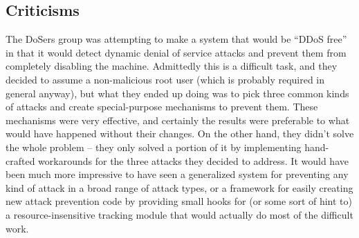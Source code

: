 \subsection{Criticisms}
\label{sec:groups:critic}

The DoSers group was attempting to make a system that would be ``DDoS free'' in
that it would detect dynamic denial of service attacks and prevent them from
completely disabling the machine. Admittedly this is a difficult task, and they
decided to assume a non-malicious root user (which is probably required in
general anyway), but what they ended up doing was to pick three common kinds of
attacks and create special-purpose mechanisms to prevent them. These mechanisms
were very effective, and certainly the results were preferable to what would
have happened without their changes. On the other hand, they didn't solve the
whole problem -- they only solved a portion of it by implementing hand-crafted
workarounds for the three attacks they decided to address. It would have been
much more impressive to have seen a generalized system for preventing any kind
of attack in a broad range of attack types, or a framework for easily creating
new attack prevention code by providing small hooks for (or some sort of hint
to) a resource-insensitive tracking module that would actually do most of the
difficult work.
